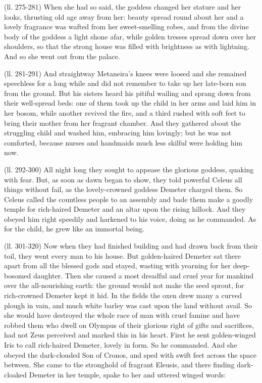 (ll. 275-281) When she had so said, the goddess changed her stature and her
looks, thrusting old age away from her: beauty spread round about her and a
lovely fragrance was wafted from her sweet-smelling robes, and from the divine
body of the goddess a light shone afar, while golden tresses spread down over
her shoulders, so that the strong house was filled with brightness as with
lightning. And so she went out from the palace.

(ll. 281-291) And straightway Metaneira’s knees were loosed and she
remained speechless for a long while and did not remember to take up her
late-born son from the ground. But his sisters heard his pitiful wailing and
sprang down from their well-spread beds: one of them took up the child in her
arms and laid him in her bosom, while another revived the fire, and a third
rushed with soft feet to bring their mother from her fragrant chamber. And they
gathered about the struggling child and washed him, embracing him lovingly; but
he was not comforted, because nurses and handmaids much less skilful were
holding him now.

(ll. 292-300) All night long they sought to appease the glorious goddess,
quaking with fear. But, as soon as dawn began to show, they told powerful
Celeus all things without fail, as the lovely-crowned goddess Demeter charged
them. So Celeus called the countless people to an assembly and bade them make a
goodly temple for rich-haired Demeter and an altar upon the rising hillock. And
they obeyed him right speedily and harkened to his voice, doing as he
commanded. As for the child, he grew like an immortal being.

(ll. 301-320) Now when they had finished building and had drawn back from their
toil, they went every man to his house. But golden-haired Demeter sat there
apart from all the blessed gods and stayed, wasting with yearning for her
deep-bosomed daughter. Then she caused a most dreadful and cruel year for
mankind over the all-nourishing earth: the ground would not make the seed
sprout, for rich-crowned Demeter kept it hid. In the fields the oxen drew many
a curved plough in vain, and much white barley was cast upon the land without
avail. So she would have destroyed the whole race of man with cruel famine and
have robbed them who dwell on Olympus of their glorious right of gifts and
sacrifices, had not Zeus perceived and marked this in his heart. First he sent
golden-winged Iris to call rich-haired Demeter, lovely in form. So he
commanded. And she obeyed the dark-clouded Son of Cronos, and sped with swift
feet across the space between. She came to the stronghold of fragrant Eleusis,
and there finding dark-cloaked Demeter in her temple, spake to her and uttered
winged words:

